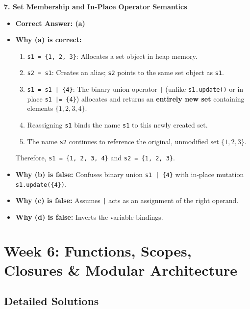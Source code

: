 \textbf{7. Set Membership and In-Place Operator Semantics}
\begin{itemize}
    \item \textbf{Correct Answer: (a)}
    \item \textbf{Why (a) is correct:}
    \begin{enumerate}
        \item \texttt{s1 = \{1, 2, 3\}}: Allocates a set object in heap memory.
        \item \texttt{s2 = s1}: Creates an alias; \texttt{s2} points to the same set object as \texttt{s1}.
        \item \texttt{s1 = s1 | \{4\}}: The binary union operator \texttt{|} (unlike \texttt{s1.update()} or in-place \texttt{s1 |= \{4\}}) allocates and returns an \textbf{entirely new set} containing elements $\{1, 2, 3, 4\}$.
        \item Reassigning \texttt{s1} binds the name \texttt{s1} to this newly created set.
        \item The name \texttt{s2} continues to reference the original, unmodified set $\{1, 2, 3\}$.
    \end{enumerate}
    Therefore, \texttt{s1 = \{1, 2, 3, 4\}} and \texttt{s2 = \{1, 2, 3\}}.
    \item \textbf{Why (b) is false:} Confuses binary union \texttt{s1 | \{4\}} with in-place mutation \texttt{s1.update(\{4\})}.
    \item \textbf{Why (c) is false:} Assumes \texttt{|} acts as an assignment of the right operand.
    \item \textbf{Why (d) is false:} Inverts the variable bindings.
\end{itemize}

\section*{Week 6: Functions, Scopes, Closures \& Modular Architecture}

\subsection*{Detailed Solutions}

